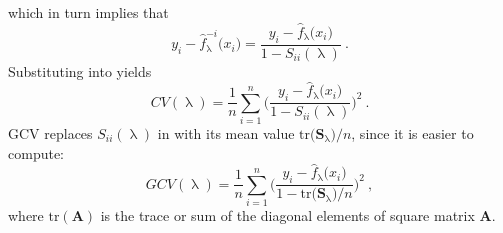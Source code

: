 which in turn implies that
\begin{equation}
  \label{eq:CrossValidationFormalDefinitionOfJackknifedFit3}
  y_i - \hat{f}_\uplambda^{-i}\bigl(x_i\bigr) = \frac{y_i - \hat{f}_\uplambda\bigl(x_i\bigr)}{1 - S_{i i}(\uplambda)}~.
\end{equation}
Substituting  into  yields
\begin{equation}
  \label{eq:CrossValidationSumOfSquares02}
  CV(\uplambda) = \frac{1}{n} \sum_{i = 1}^n\Biggl(\frac{y_i - \hat{f}_\uplambda\bigl(x_i\bigr)}{1 - S_{i i}(\uplambda)}\Biggr)^2~.
\end{equation}
GCV replaces \(S_{ii}(\uplambda)\) in  with its mean value \(\text{tr}\bigl(\symbf{S}_\uplambda\bigr) \big/ n\), since it is easier to compute:
\begin{equation}
  \label{eq:GeneralizedCrossValidation}
  GCV(\uplambda) = \frac{1}{n} \sum_{i = 1}^n\Biggl(\frac{y_i - \hat{f}_\uplambda\bigl(x_i\bigr)}{1 - \text{tr}\bigl(\symbf{S}_\uplambda\bigr) \big/ n}\Biggr)^2~,
\end{equation}
where \(\text{tr}(\symbf{A})\) is the trace or sum of the diagonal elements of square matrix \(\symbf{A}\).


